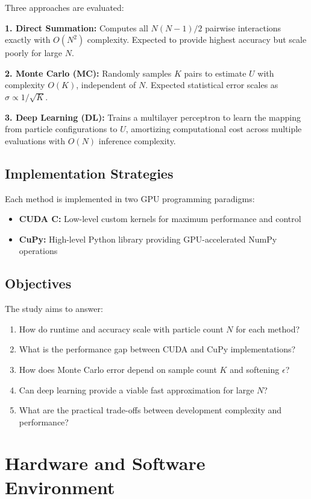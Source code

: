 \documentclass[11pt,a4paper]{article}
\begin{document}
Three approaches are evaluated:

\textbf{1. Direct Summation:} Computes all $N(N-1)/2$ pairwise interactions exactly with $O(N^2)$ complexity. Expected to provide highest accuracy but scale poorly for large $N$.

\textbf{2. Monte Carlo (MC):} Randomly samples $K$ pairs to estimate $U$ with complexity $O(K)$, independent of $N$. Expected statistical error scales as $\sigma \propto 1/\sqrt{K}$.

\textbf{3. Deep Learning (DL):} Trains a multilayer perceptron to learn the mapping from particle configurations to $U$, amortizing computational cost across multiple evaluations with $O(N)$ inference complexity.

\subsection{Implementation Strategies}

Each method is implemented in two GPU programming paradigms:
\begin{itemize}
\item \textbf{CUDA C:} Low-level custom kernels for maximum performance and control
\item \textbf{CuPy:} High-level Python library providing GPU-accelerated NumPy operations
\end{itemize}

\subsection{Objectives}

The study aims to answer:
\begin{enumerate}
\item How do runtime and accuracy scale with particle count $N$ for each method?
\item What is the performance gap between CUDA and CuPy implementations?
\item How does Monte Carlo error depend on sample count $K$ and softening $\epsilon$?
\item Can deep learning provide a viable fast approximation for large $N$?
\item What are the practical trade-offs between development complexity and performance?
\end{enumerate}

\section{Hardware and Software Environment}
\end{document}
